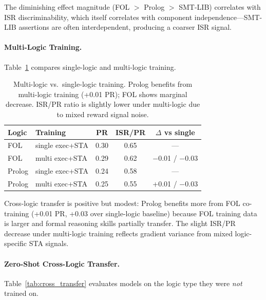 \documentclass[11pt,a4paper]{article}
\begin{document}
The diminishing effect magnitude (FOL $>$ Prolog $>$ SMT-LIB) correlates with ISR discriminability, which itself correlates with component independence---SMT-LIB assertions are often interdependent, producing a coarser ISR signal.

\paragraph{Multi-Logic Training.}
Table~\ref{tab:multi_logic} compares single-logic and multi-logic training.

\begin{table}[t]
\centering
\small
\begin{tabular}{llccc}
\toprule
\textbf{Logic} & \textbf{Training} & \textbf{PR} & \textbf{ISR/PR} & $\Delta$ \textbf{vs single} \\
\midrule
FOL & single exec+STA & 0.30 & 0.65 & --- \\
FOL & multi exec+STA & 0.29 & 0.62 & $-$0.01 / $-$0.03 \\
Prolog & single exec+STA & 0.24 & 0.58 & --- \\
Prolog & multi exec+STA & 0.25 & 0.55 & +0.01 / $-$0.03 \\
\bottomrule
\end{tabular}
\caption{Multi-logic vs.\ single-logic training. Prolog benefits from multi-logic training (+0.01 PR); FOL shows marginal decrease. ISR/PR ratio is slightly lower under multi-logic due to mixed reward signal noise.}
\label{tab:multi_logic}
\end{table}

Cross-logic transfer is positive but modest: Prolog benefits more from FOL co-training (+0.01 PR, +0.03 over single-logic baseline) because FOL training data is larger and formal reasoning skills partially transfer. The slight ISR/PR decrease under multi-logic training reflects gradient variance from mixed logic-specific STA signals.

\paragraph{Zero-Shot Cross-Logic Transfer.}
Table~\ref{tab:cross_transfer} evaluates models on the logic type they were \emph{not} trained on.
\end{document}
